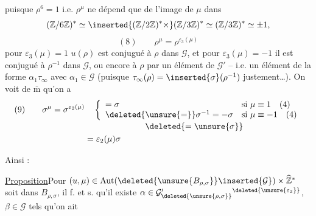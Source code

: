 puisque $\rho^6=1$ i.e. $\rho^\mu$ ne dépend que de l'image
de $\mu$ dans
\[
(\mathbb Z/6\mathbb Z)^*\simeq
\inserted{(\mathbb Z/2\mathbb Z)^*\times}
(\mathbb Z/3\mathbb Z)^*\simeq(\mathbb Z/3\mathbb Z)^*\simeq\pm1,
\]
\[
(8)\qquad \rho^\mu=\rho^{\varepsilon_3(\mu)}
\]
 pour $\varepsilon_3(\mu)=1$
$u(\rho)$ est conjugué à $\rho$ dans $\mathcal{G}$, et pour
$\varepsilon_3(\mu)=-1$ il est conjugué à $\rho^{-1}$ dans
$\mathcal{G}$, ou encore à $\rho$ par un élément de
$\mathcal{G}'$ -- i.e. un élément de la forme $\alpha_1\tau_\infty$
avec $\alpha_1\in\mathcal{G}$ (puisque
$\tau_\infty(\rho)=\inserted{\sigma}(\rho^{-1})$ justement\ldots).
\deleted{\[
(9)\qquad u(\rho)=\zeta\rho,\qquad u(\sigma)=\eta\sigma
\quad(\zeta,\eta\in\mathcal{G})
\]}
\deleted{\[
(10)\qquad \zeta=\alpha\rho(\unsure{\alpha|\alpha_1})^{-1},
\qquad\eta=\beta
\]}
On voit de $\overline{\mathrm m}$ qu'on a
\[
\begin{aligned}
(9)\qquad \sigma^\mu=\sigma^{\varepsilon_2(\mu)}
&\quad\left\{\begin{array}{ll}
=\sigma&\text{si }\mu\equiv1\quad(4)\\
\deleted{\unsure{=}}\sigma^{-1}=-\sigma
&\text{si }\mu\equiv-1\quad(4)
\end{array}\right.\\[-2pt]
&\hspace{2.5cm}\deleted{=\unsure{\sigma}}\\
&=\varepsilon_2(\mu)\sigma
\end{aligned}
\]

Ainsi :

\uline{Proposition}\quad Pour 
$(u,\mu)\in\operatorname{Aut}
(\deleted{\unsure{B_{\rho,\sigma}}}\inserted{\mathcal{G}})
\times\widehat{\mathbb Z}^{*}$ soit dans $B_{\rho,\sigma}$,
il f. et s. qu'il existe
$\alpha\in\mathcal{G}'_{\deleted{\unsure{\rho,\sigma}}}
{}^{\deleted{\unsure{\varepsilon_3}}}$,
$\beta\in\mathcal{G}$ tels qu'on ait


